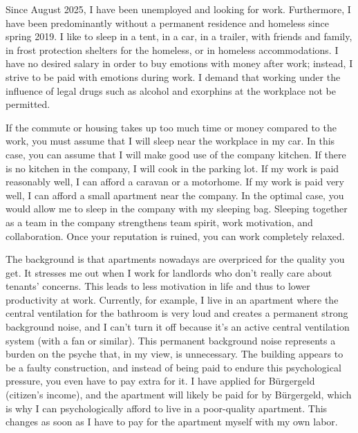 \documentclass[fromphone,parskip=half]{scrlttr2}%
\newcommand\versionLanguageStart{}
\begin{document}
	\begin{letter}%
	{
		\addressReceiver
	}
		\opening{\joinList{\dear}{\genderReceiver}{\surnameReceiver}{,}}
\versionLanguageStart%
		Since August 2025, I have been unemployed and looking for work.  
		Furthermore, I have been predominantly without a permanent residence and homeless since spring 2019.  
		I like to sleep in a tent, in a car, in a trailer, with friends and family, in frost protection shelters for the homeless, or in homeless accommodations.  
		I have no desired salary in order to buy emotions with money after work; instead, I strive to be paid with emotions during work.  
		I demand that working under the influence of legal drugs such as alcohol and exorphins at the workplace not be permitted.

		If the commute or housing takes up too much time or money compared to the work, you must assume that I will sleep near the workplace in my car.  
		In this case, you can assume that I will make good use of the company kitchen.  
		If there is no kitchen in the company, I will cook in the parking lot.  
		If my work is paid reasonably well, I can afford a caravan or a motorhome.  
		If my work is paid very well, I can afford a small apartment near the company.  
		In the optimal case, you would allow me to sleep in the company with my sleeping bag.  
		Sleeping together as a team in the company strengthens team spirit, work motivation, and collaboration.  
		Once your reputation is ruined, you can work completely relaxed.

		The background is that apartments nowadays are overpriced for the quality you get.  
		It stresses me out when I work for landlords who don't really care about tenants' concerns.  
		This leads to less motivation in life and thus to lower productivity at work.  
		Currently, for example, I live in an apartment where the central ventilation for the bathroom is very loud and creates a permanent strong background noise, and I can't turn it off because it's an active central ventilation system (with a fan or similar).  
		This permanent background noise represents a burden on the psyche that, in my view, is unnecessary.  
		The building appears to be a faulty construction, and instead of being paid to endure this psychological pressure, you even have to pay extra for it.  
		I have applied for Bürgergeld (citizen's income), and the apartment will likely be paid for by Bürgergeld, which is why I can psychologically afford to live in a poor-quality apartment.  
		This changes as soon as I have to pay for the apartment myself with my own labor.


\end{letter}
\end{document}
